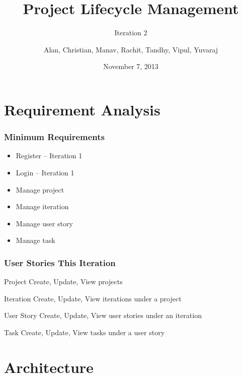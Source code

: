 \documentclass[final]{beamer}
\title[PLM] %
{Project Lifecycle Management}
\subtitle{Iteration 2}
\author[] %
{Alan, Christian, Manav, Rachit, Tandhy, Vipul, Yuvaraj}
\date[November 7, 2013] %
{November 7, 2013}
\begin{document}
\begin{frame}
	\titlepage
\end{frame}

\section{Requirement Analysis}

\begin{frame}
	\frametitle{Minimum Requirements}
	\begin{beamerboxesrounded}[shadow]{}
		\begin{itemize}
			\item{Register -- Iteration 1}
			\item{Login -- Iteration 1}
			\item{Manage project}
			\item{Manage iteration}
			\item{Manage user story}
			\item{Manage task}
		\end{itemize}
	\end{beamerboxesrounded}
\end{frame}

\begin{frame}
	\frametitle{User Stories This Iteration}
	\begin{beamerboxesrounded}[shadow]{Project}
		Create, Update, View projects
	\end{beamerboxesrounded}

	\begin{beamerboxesrounded}[shadow]{Iteration}
		Create, Update, View iterations under a project
	\end{beamerboxesrounded}

	\begin{beamerboxesrounded}[shadow]{User Story}
		Create, Update, View user stories under an iteration
	\end{beamerboxesrounded}

	\begin{beamerboxesrounded}[shadow]{Task}
		Create, Update, View tasks under a user story
	\end{beamerboxesrounded}
\end{frame}

\section{Architecture}
\end{document}
